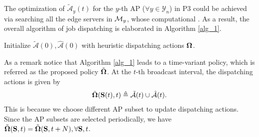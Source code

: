 The optimization of $\tilde{\mathcal{A}}_{y}(t)$ for the $y$-th AP ($\forall y\in\mathcal{Y}_{n}$) in P3 could be achieved via searching all the edge servers in $\mathcal{M}_{y}$, whose computational .
As a result, the overall algorithm of job dispatching is elaborated in Algorithm \ref{alg_1}.
\begin{algorithm}[ht]
    \caption{}\label{alg_1}
    \DontPrintSemicolon %
    Initialize $\tilde{\mathcal{A}}(0),\hat{\mathcal{A}}(0)$ with heuristic dispatching actions $\boldsymbol{\Omega}$.\;
\end{algorithm}


As a remark notice that Algorithm \ref{alg_1} leads to a time-variant policy, which is referred as the proposed policy $\tilde{\boldsymbol{\Omega}}$.
At the $t$-th broadcast interval, the dispatching actions is given by
\begin{align}
    \tilde{\boldsymbol{\Omega}}(\mathbf{S}(t), t) \triangleq \tilde{\mathcal{A}}(t) \cup \hat{\mathcal{A}}(t).
\end{align}
This is because we choose different AP subset to update dispatching actions.
Since the AP subsets are selected periodically, we have $\tilde{\boldsymbol{\Omega}}(\mathbf{S}, t) = \tilde{\boldsymbol{\Omega}}(\mathbf{S}, t+N), \forall \mathbf{S},t$.

